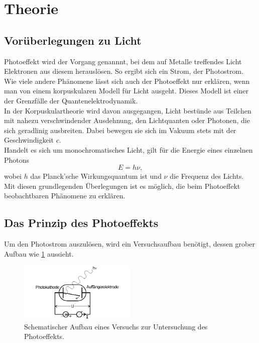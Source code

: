 \section{Theorie}
\label{sec:Theorie}

\subsection{Vorüberlegungen zu Licht}
    Photoeffekt wird der Vorgang genannnt, bei dem auf Metalle treffendes Licht Elektronen aus diesem herauslösen. So ergibt 
    sich ein Strom, der Photostrom. \\
    Wie viele andere Phänomene lässt sich auch der Photoeffekt nur erklären, wenn man von einem korpuskularen Modell für 
    Licht ausgeht. Dieses Modell ist einer der Grenzfälle der Quantenelektrodynamik.\\
    In der Korpuskulartheorie wird davon ausgegangen, Licht bestünde aus Teilchen mit nahezu verschwindender Ausdehnung, 
    den Lichtquanten oder Photonen, die sich 
    geradlinig ausbreiten. Dabei bewegen sie sich im Vakuum stets mit der Geschwindigkeit $c$.\\
    Handelt es sich um monochromatisches Licht, gilt für die Energie eines einzelnen Photons
    \begin{equation}
        E = h \nu ,
        \label{eqn:energie}
    \end{equation}
    wobei $h$ das Planck'sche Wirkungsquantum ist und $\nu$ die Frequenz des Lichts. \\
    Mit diesen grundlegenden Überlegungen ist es möglich, die beim Photoeffekt beobachtbaren Phänomene zu erklären.

\subsection{Das Prinzip des Photoeffekts}
    Um den Photostrom auszulösen, wird ein Versuchsaufbau benötigt, dessen grober Aufbau wie \ref{fig:prinzip} aussieht.

    \begin{figure}
        \centering
        \includegraphics[width=0.5\textwidth]{prinzip.png}
        \caption{Schematischer Aufbau eines Versuchs zur Untersuchung des Photoeffekts.}
        \label{fig:prinzip}
    \end{figure}

